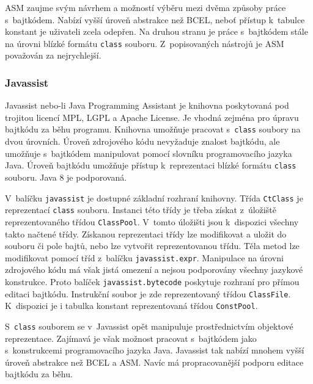 ASM zaujme svým návrhem a možností výběru mezi dvěma způsoby práce s~bajtkódem. Nabízí vyšší úroveň abstrakce než BCEL, neboť přístup k~tabulce konstant je uživateli zcela odepřen. Na druhou stranu je práce s~bajtkódem stále na úrovni blízké formátu \texttt{class} souboru. Z~popisovaných nástrojů je ASM považován za nejrychlejší.


\subsubsection{Javassist}\label{ToolsJavassist}

Javassist nebo-li Java Programming Assistant \cite{Javassist} je knihovna poskytovaná pod trojitou licencí MPL, LGPL a Apache License. Je vhodná zejména pro úpravu bajtkódu za běhu programu. Knihovna umožňuje pracovat s~\texttt{class} soubory na dvou úrovních. Úroveň zdrojového kódu nevyžaduje znalost bajtkódu, ale umožňuje s~bajtkódem manipulovat pomocí slovníku programovacího jazyka Java. Úroveň bajtkódu umožňuje přístup k~reprezentaci blízké formátu \texttt{class} souboru. Java 8 je podporovaná.

V~balíčku \texttt{javassist} je dostupné základní rozhraní knihovny. Třída \texttt{CtClass} je reprezentací \texttt{class} souboru. Instanci této třídy je třeba získat z~úložiště reprezentovaného třídou \texttt{ClassPool}. V~tomto úložišti jsou k~dispozici všechny takto načtené třídy. Získanou reprezentaci třídy lze modifikovat a uložit do souboru či pole bajtů, nebo lze vytvořit reprezentovanou třídu. Těla metod lze modifikovat pomocí tříd z~balíčku \texttt{javassist.expr}. Manipulace na úrovni zdrojového kódu má však jistá omezení a nejsou podporovány všechny jazykové konstrukce. Proto balíček \texttt{javassist.bytecode} poskytuje rozhraní pro přímou editaci bajtkódu. Instrukční soubor je zde reprezentovaný třídou \texttt{ClassFile}. K~dispozici je i tabulka konstant reprezentovaná třídou \texttt{ConstPool}.

S~\texttt{class} souborem se v~Javassist opět manipuluje prostřednictvím objektové reprezentace. Zajímavá je však možnost pracovat s~bajtkódem jako s~konstrukcemi programovacího jazyka Java. Javassist tak nabízí mnohem vyšší úroveň abstrakce než BCEL a ASM. Navíc má propracovanější podporu editace bajtkódu za běhu.

